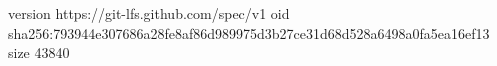 version https://git-lfs.github.com/spec/v1
oid sha256:793944e307686a28fe8af86d989975d3b27ce31d68d528a6498a0fa5ea16ef13
size 43840

